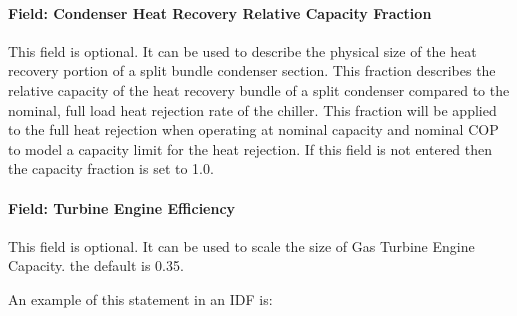 \paragraph{Field: Condenser Heat Recovery Relative Capacity Fraction}\label{field-heat-recovery-fraction}

This field is optional. It can be used to describe the physical size of the heat recovery portion of a split bundle condenser section. This fraction describes the relative capacity of the heat recovery bundle of a split condenser compared to the nominal, full load heat rejection rate of the chiller. This fraction will be applied to the full heat rejection when operating at nominal capacity and nominal COP to model a capacity limit for the heat rejection. If this field is not entered then the capacity fraction is set to 1.0.

\paragraph{Field: Turbine Engine Efficiency}\label{field-engine-efficiency}

This field is optional. It can be used to scale the size of Gas Turbine Engine Capacity. the default is 0.35.

An example of this statement in an IDF is:

